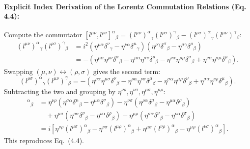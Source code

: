 \documentclass[11pt,a4paper]{article}
\begin{document}
\paragraph{Explicit Index Derivation of the Lorentz Commutation Relations (Eq. 4.4):}
Compute the commutator $[l^{\mu\nu}, l^{\rho\sigma}]^\alpha{}_\beta = (l^{\mu\nu})^\alpha{}_\gamma (l^{\rho\sigma})^\gamma{}_\beta - (l^{\rho\sigma})^\alpha{}_\gamma (l^{\mu\nu})^\gamma{}_\beta$:
\begin{align}
    (l^{\mu\nu})^\alpha{}_\gamma (l^{\rho\sigma})^\gamma{}_\beta &= i^2 \left(\eta^{\mu\alpha}\delta^\nu{}_\gamma - \eta^{\nu\alpha}\delta^\mu{}_\gamma\right)\left(\eta^{\rho\gamma}\delta^\sigma{}_\beta - \eta^{\sigma\gamma}\delta^\rho{}_\beta\right) \nonumber \\
    &= -\left(\eta^{\mu\alpha}\eta^{\rho\nu}\delta^\sigma{}_\beta - \eta^{\mu\alpha}\eta^{\sigma\nu}\delta^\rho{}_\beta - \eta^{\nu\alpha}\eta^{\rho\mu}\delta^\sigma{}_\beta + \eta^{\nu\alpha}\eta^{\sigma\mu}\delta^\rho{}_\beta\right).
\end{align}
Swapping $(\mu,\nu) \leftrightarrow (\rho,\sigma)$ gives the second term:
\begin{equation}
    (l^{\rho\sigma})^\alpha{}_\gamma (l^{\mu\nu})^\gamma{}_\beta = -\left(\eta^{\rho\alpha}\eta^{\mu\sigma}\delta^\nu{}_\beta - \eta^{\rho\alpha}\eta^{\nu\sigma}\delta^\mu{}_\beta - \eta^{\sigma\alpha}\eta^{\mu\rho}\delta^\nu{}_\beta + \eta^{\sigma\alpha}\eta^{\nu\rho}\delta^\mu{}_\beta\right).
\end{equation}
Subtracting the two and grouping by $\eta^{\nu\rho}, \eta^{\nu\sigma}, \eta^{\mu\sigma}, \eta^{\mu\rho}$:
\begin{align}
    [l^{\mu\nu}, l^{\rho\sigma}]^\alpha{}_\beta &= \eta^{\nu\rho}\left(\eta^{\sigma\alpha}\delta^\mu{}_\beta - \eta^{\mu\alpha}\delta^\sigma{}_\beta\right) - \eta^{\nu\sigma}\left(\eta^{\rho\alpha}\delta^\mu{}_\beta - \eta^{\mu\alpha}\delta^\rho{}_\beta\right) \nonumber \\
    &\quad + \eta^{\mu\sigma}\left(\eta^{\rho\alpha}\delta^\nu{}_\beta - \eta^{\nu\alpha}\delta^\rho{}_\beta\right) - \eta^{\mu\rho}\left(\eta^{\sigma\alpha}\delta^\nu{}_\beta - \eta^{\nu\alpha}\delta^\sigma{}_\beta\right) \nonumber \\
    &= i\left[\eta^{\nu\rho}(l^{\mu\sigma})^\alpha{}_\beta - \eta^{\nu\sigma}(l^{\mu\rho})^\alpha{}_\beta + \eta^{\mu\sigma}(l^{\nu\rho})^\alpha{}_\beta - \eta^{\mu\rho}(l^{\nu\sigma})^\alpha{}_\beta\right].
\end{align}
This reproduces Eq.~(4.4).
\end{document}
